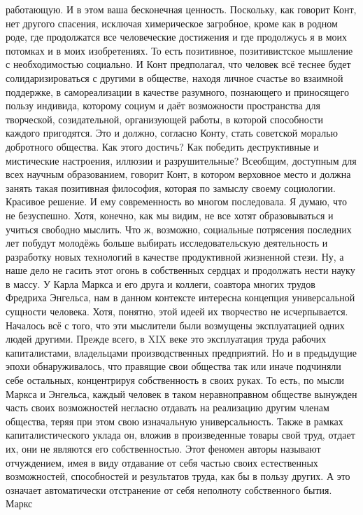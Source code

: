 работающую. И в этом ваша бесконечная ценность. Поскольку, как говорит Конт, нет
другого спасения, исключая химерическое загробное, кроме как в родном роде, где
продолжатся все человеческие достижения и где продолжусь я в моих потомках и в
моих изобретениях. То есть позитивное, позитивистское мышление с необходимостью
социально. И Конт предполагал, что человек всё теснее будет солидаризироваться с
другими в обществе, находя личное счастье во взаимной поддержке, в
самореализации в качестве разумного, познающего и приносящего пользу индивида,
которому социум и даёт возможности пространства для творческой, созидательной,
организующей работы, в которой способности каждого пригодятся. Это и должно,
согласно Конту, стать советской моралью добротного общества. Как этого достичь?
Как победить деструктивные и мистические настроения, иллюзии и разрушительные?
Всеобщим, доступным для всех научным образованием, говорит Конт, в котором
верховное место и должна занять такая позитивная философия, которая по замыслу
своему социологии. Красивое решение. И ему современность во многом последовала.
Я думаю, что не безуспешно. Хотя, конечно, как мы видим, не все хотят
образовываться и учиться свободно мыслить. Что ж, возможно, социальные
потрясения последних лет побудут молодёжь больше выбирать исследовательскую
деятельность и разработку новых технологий в качестве продуктивной жизненной
стези. Ну, а наше дело не гасить этот огонь в собственных сердцах и продолжать
нести науку в массу. У Карла Маркса и его друга и коллеги, соавтора многих
трудов Фредриха Энгельса, нам в данном контексте интересна концепция
универсальной сущности человека. Хотя, понятно, этой идеей их творчество не
исчерпывается. Началось всё с того, что эти мыслители были возмущены
эксплуатацией одних людей другими. Прежде всего, в XIX веке это эксплуатация
труда рабочих капиталистами, владельцами производственных предприятий. Но и в
предыдущие эпохи обнаруживалось, что правящие свои общества так или иначе
подчиняли себе остальных, концентрируя собственность в своих руках. То есть, по
мысли Маркса и Энгельса, каждый человек в таком неравноправном обществе вынужден
часть своих возможностей негласно отдавать на реализацию другим членам общества,
теряя при этом свою изначальную универсальность. Также в рамках
капиталистического уклада он, вложив в произведенные товары свой труд, отдает
их, они не являются его собственностью. Этот феномен авторы называют
отчуждением, имея в виду отдавание от себя частью своих естественных
возможностей, способностей и результатов труда, как бы в пользу других. А это
означает автоматически отстранение от себя неполноту собственного бытия. Маркс
